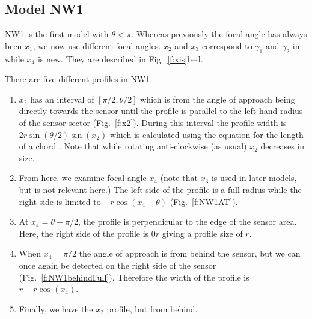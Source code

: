 \subsection{Model NW1} \label{NW1}

NW1 is the first model with $\theta < \pi$. Whereas previously the focal angle has always been $x_1$, we now use different focal angles. $x_2$ and $x_3$ correspond to $\gamma_1$ and $\gamma_2$ in \citep{rowcliffe2008estimating} while $x_4$ is new. They are described in Fig.~\ref{f:xis}b--d. 

There are five different profiles in NW1.
\begin{enumerate}
\item $x_2$ has an interval of $[\pi/2, \theta/2]$ which is from the angle of approach being directly towards the sensor until the profile is parallel to the left hand radius of the sensor sector (Fig.~\ref{f:x2}). During this interval the profile width is $2r\sin\left(\theta/2\right)\sin(x_2)$ which is calculated using the equation for the length of a chord . Note that while rotating anti-clockwise (as usual) $x_2$ decreases in size.
\item From here, we examine focal angle $x_4$ (note that $x_3$ is used in later models, but is not relevant here.)  The left side of the profile is a full radius while the right side is limited to $- r\cos(x_4 - \theta)$ (Fig.~\ref{f:NW1AT}).
\item At $x_4 =  \theta - \pi/2$, the profile is perpendicular to the edge of the sensor area. Here, the right side of the profile is $0r$ giving a profile size of $r$.   %
\item When $x_4 = \pi/2$ the angle of approach is from behind the sensor, but we can once again be detected on the right side of the sensor (Fig.~\ref{f:NW1behindFull}). Therefore the width of the profile is $r - r\cos(x_4)$.
\item  Finally, we have the $x_2$ profile, but from behind. 
\end{enumerate}





